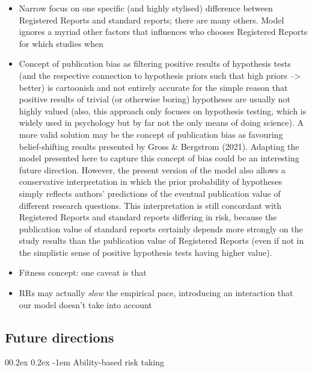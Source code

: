\documentclass[
  ,man,mask,floatsintext]{apa6}
\makeatletter
\let\oldparagraph\paragraph
\renewcommand{\paragraph}[1]{\oldparagraph{#1}\mbox{}}
\renewcommand{\paragraph}{\@startsection{paragraph}{4}{\parindent}%
  {0\baselineskip \@plus 0.2ex \@minus 0.2ex}%
  {-1em}%
  {\normalfont\normalsize\bfseries\itshape\typesectitle}}
\makeatother
\begin{document}
\begin{itemize}
\item
  Narrow focus on one specific (and highly stylised) difference between Registered Reports and standard reports; there are many others. Model ignores a myriad other factors that influences who chooses Registered Reports for which studies when
\item
  Concept of publication bias as filtering positive results of hypothesis tests (and the respective connection to hypothesis priors such that high priors --\textgreater{} better) is cartoonish and not entirely accurate for the simple reason that positive results of trivial (or otherwise boring) hypotheses are usually not highly valued (also, this approach only focuses on hypothesis testing, which is widely used in psychology but by far not the only means of doing science).
  A more valid solution may be the concept of publication bias as favouring belief-shifting results presented by Gross \& Bergstrom (2021).
  Adapting the model presented here to capture this concept of bias could be an interesting future direction.
  However, the present version of the model also allows a conservative interpretation in which the prior probability of hypotheses simply reflects authors' predictions of the eventual publication value of different research questions.
  This interpretation is still concordant with Registered Reports and standard reports differing in risk, because the publication value of standard reports certainly depends more strongly on the study results than the publication value of Registered Reports (even if not in the simplistic sense of positive hypothesis tests having higher value).
\item
  Fitness concept: one caveat is that
\item
  RRs may actually \emph{slow} the empirical pace, introducing an interaction that our model doesn't take into account
\end{itemize}

\hypertarget{future-directions}{%
\subsection{Future directions}\label{future-directions}}

\hypertarget{ability-based-risk-taking}{%
\paragraph{Ability-based risk taking}\label{ability-based-risk-taking}}
\end{document}
